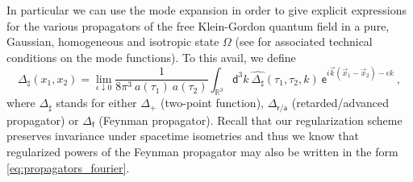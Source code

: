 \documentclass[12pt]{book}
\let\int\int
\newcommand{\asf}{\mathsf{a}}
\newcommand{\dsf}{\mathsf{d}}
\newcommand{\esf}{\mathsf{e}}
\newcommand{\fsf}{\mathsf{f}}
\newcommand{\rsf}{\mathsf{r}}
\theoremstyle{break}
\begin{document}
In particular we can use the mode expansion in order to give explicit expressions for the various propagators of the free Klein-Gordon quantum field in a pure, Gaussian, homogeneous and isotropic state $\Omega$ (see \cite{pinamonti_initial_2011,zschoche_chaplygin_2014}
for associated technical conditions on the mode functions). To this avail, we define
%
\begin{equation}
\Delta_\sharp(x_1,x_2) = \lim_{\epsilon\downarrow 0} \frac{1}{8\pi^3 \ a(\tau_1) \ a(\tau_2)} \int_{\mathbb{R}^3} \dsf^3k \ \widehat{\Delta_\sharp}(\tau_1,\tau_2,k) \ \esf^{i\vec{k}(\vec{x}_1-\vec{x}_2)-\epsilon k} \ ,
\label{eq:propagators_fourier}
\end{equation}
%
where $\Delta_\sharp$ stands for either $\Delta_+$ (two-point function), $\Delta_{\rsf/\asf}$ (retarded/advanced propagator) or $\Delta_\fsf$ (Feynman propagator). Recall that our regularization scheme preserves invariance under spacetime isometries and thus we know that regularized powers of the Feynman propagator may also be written in the form \eqref{eq:propagators_fourier}.
\end{document}

